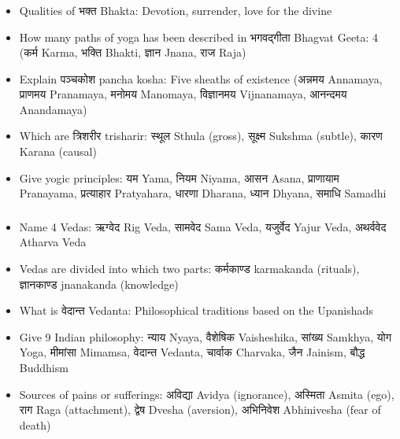 \begin{frame}[fragile]\frametitle{}
\begin{itemize}
\item Qualities of भक्त Bhakta: Devotion, surrender, love for the divine
\item How many paths of yoga has been described in भगवद्गीता Bhagvat Geeta: 4 (कर्म Karma, भक्ति Bhakti, ज्ञान Jnana, राज Raja)
\item Explain पञ्चकोश pancha kosha: Five sheaths of existence (अन्नमय Annamaya, प्राणमय Pranamaya, मनोमय Manomaya, विज्ञानमय Vijnanamaya, आनन्दमय Anandamaya)
\item Which are त्रिशरीर trisharir: स्थूल Sthula (gross), सूक्ष्म Sukshma (subtle), कारण Karana (causal)
\item Give yogic principles: यम Yama, नियम Niyama, आसन Asana, प्राणायाम Pranayama, प्रत्याहार Pratyahara, धारणा Dharana, ध्यान Dhyana, समाधि Samadhi
\end{itemize}
\end{frame}

\begin{frame}[fragile]\frametitle{}
\begin{itemize}
\item Name 4 Vedas: ऋग्वेद Rig Veda, सामवेद Sama Veda, यजुर्वेद Yajur Veda, अथर्ववेद Atharva Veda
\item Vedas are divided into which two parts: कर्मकाण्ड karmakanda (rituals), ज्ञानकाण्ड jnanakanda (knowledge)
\item What is वेदान्त Vedanta: Philosophical traditions based on the Upanishads
\item Give 9 Indian philosophy: न्याय Nyaya, वैशेषिक Vaisheshika, सांख्य Samkhya, योग Yoga, मीमांसा Mimamsa, वेदान्त Vedanta, चार्वाक Charvaka, जैन Jainism, बौद्ध Buddhism
\item Sources of pains or sufferings: अविद्या Avidya (ignorance), अस्मिता Asmita (ego), राग Raga (attachment), द्वेष Dvesha (aversion), अभिनिवेश Abhinivesha (fear of death)
\end{itemize}
\end{frame}

